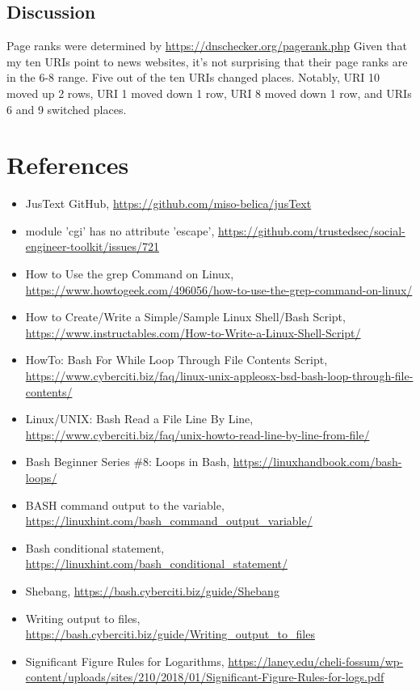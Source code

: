 \documentclass[12pt]{article}
\begin{document}
\subsection*{Discussion}
Page ranks were determined by \url{https://dnschecker.org/pagerank.php}  Given that my ten URIs point to news websites, it's not surprising that their page ranks are in the 6-8 range.  Five out of the ten URIs changed places.  Notably, URI 10 moved up 2 rows, URI 1 moved down 1 row, URI 8 moved down 1 row, and URIs 6 and 9 switched places.

\section*{References}

\begin{itemize}
    \item { JusText GitHub, \url{ https://github.com/miso-belica/jusText }}
    \item { module 'cgi' has no attribute 'escape', \url{ https://github.com/trustedsec/social-engineer-toolkit/issues/721 }}
    \item { How to Use the grep Command on Linux, \url{ https://www.howtogeek.com/496056/how-to-use-the-grep-command-on-linux/ }}
    \item { How to Create/Write a Simple/Sample Linux Shell/Bash Script, \url{ https://www.instructables.com/How-to-Write-a-Linux-Shell-Script/ }}
    \item { HowTo: Bash For While Loop Through File Contents Script, \url{https://www.cyberciti.biz/faq/linux-unix-appleosx-bsd-bash-loop-through-file-contents/ }}
    \item { Linux/UNIX: Bash Read a File Line By Line, \url{ https://www.cyberciti.biz/faq/unix-howto-read-line-by-line-from-file/ }}
    \item { Bash Beginner Series \#8: Loops in Bash, \url{ https://linuxhandbook.com/bash-loops/ }}
    \item { BASH command output to the variable, \url{ https://linuxhint.com/bash_command_output_variable/ }}
    \item { Bash conditional statement, \url{ https://linuxhint.com/bash_conditional_statement/ }}
    \item { Shebang, \url{https://bash.cyberciti.biz/guide/Shebang }}
    \item { Writing output to files, \url{ https://bash.cyberciti.biz/guide/Writing_output_to_files }}
    \item { Significant Figure Rules for Logarithms, \url{ https://laney.edu/cheli-fossum/wp-content/uploads/sites/210/2018/01/Significant-Figure-Rules-for-logs.pdf }}

\end{itemize}
\end{document}
